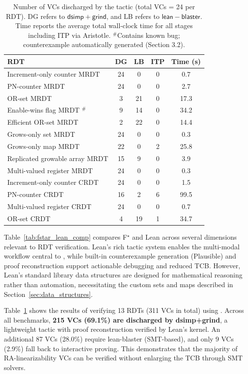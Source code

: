 \documentclass[sigplan,twocolumn,accept]{acmart}
\newcommand{\F}[1]{\mathsf{#1}}
\newcommand{\fstar}{F$^{\star}$\xspace}
\begin{document}
\begin{table}[t]
\caption{Number of VCs discharged by the \sal tactic (total VCs = 24 per RDT). DG refers to $\F{dsimp + grind}$, and LB refers to $\F{lean-blaster}$. Time reports the average total wall-clock time for all stages including ITP via Aristotle. $^{\#}$Contains known bug; counterexample automatically generated (Section 3.2).}
\label{tab:results_1}
\centering
\footnotesize
\begin{tabular}{lcccc}
\toprule
\textbf{RDT} &
\textbf{DG} &
\textbf{LB} &
\textbf{ITP} &
\textbf{Time (s)} \\
\midrule
Increment-only counter MRDT    & 24 & 0  & 0 & 0.7  \\
PN-counter MRDT                & 24 & 0  & 0 & 2.7  \\
OR-set MRDT                    & 3  & 21 & 0 & 17.3 \\
Enable-wins flag MRDT $^{\#}$  & 9  & 14 & 0 & 34.2 \\
Efficient OR-set MRDT          & 2  & 22 & 0 & 14.4 \\
Grows-only set MRDT            & 24 & 0  & 0 & 0.3  \\
Grows-only map MRDT            & 22 & 0  & 2 & 25.8 \\
Replicated growable array MRDT & 15 & 9  & 0 & 3.9  \\
Multi-valued register MRDT     & 24 & 0  & 0 & 0.3  \\
Increment-only counter CRDT    & 24 & 0  & 0 & 1.5  \\
PN-counter CRDT                & 16 & 2  & 6 & 99.5 \\
Multi-valued register CRDT     & 24 & 0  & 0 & 0.7  \\
OR-set CRDT                    & 4  & 19 & 1 & 34.7 \\
\bottomrule
\end{tabular}
\end{table}

Table~\ref{tab:fstar_lean_comp} compares \fstar and Lean across several dimensions relevant to RDT verification. Lean's rich tactic system enables the multi-modal workflow central to \sal, while built-in counterexample generation (Plausible) and proof reconstruction support actionable debugging and reduced TCB. However, Lean's standard library data structures are designed for mathematical reasoning rather than automation, necessitating the custom sets and maps described in Section~\ref{sec:data_structures}.

Table~\ref{tab:results_1} shows the results of verifying 13 RDTs (311 VCs in total) using \sal. Across all benchmarks, \textbf{215 VCs (69.1\%) are discharged by dsimp+grind}, a lightweight tactic with proof reconstruction verified by Lean's kernel. An additional 87 VCs (28.0\%) require lean-blaster (SMT-based), and only 9 VCs (2.9\%) fall back to interactive proving. This demonstrates that the majority of RA-linearizability VCs can be verified without enlarging the TCB through SMT solvers.
\end{document}
